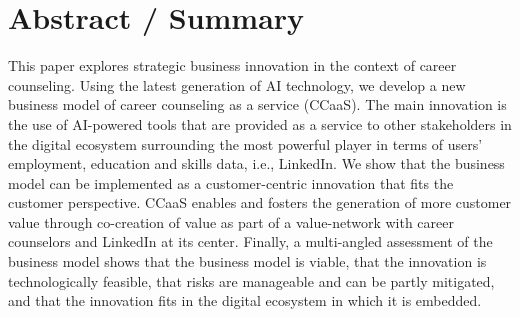\vspace*{3cm}

\section*{Abstract / Summary}

This paper explores strategic business innovation in the context of career counseling. Using
the latest generation of AI technology, we develop a new business model of career counseling
as a service (CCaaS). The main innovation is the use of AI-powered tools that are provided 
as a service to other stakeholders in the digital ecosystem surrounding the most powerful
player in terms of users' employment, education and skills data, i.e., LinkedIn. We show
that the business model can be implemented as a customer-centric innovation that fits the
customer perspective. CCaaS enables and fosters the generation of more customer value through
co-creation of value as part of a value-network with career counselors and LinkedIn at its
center. Finally, a multi-angled assessment of the business model shows that the business model
is viable, that the innovation is technologically feasible, that risks are manageable and can
be partly mitigated, and that the innovation fits in the digital ecosystem in which it is
embedded.



